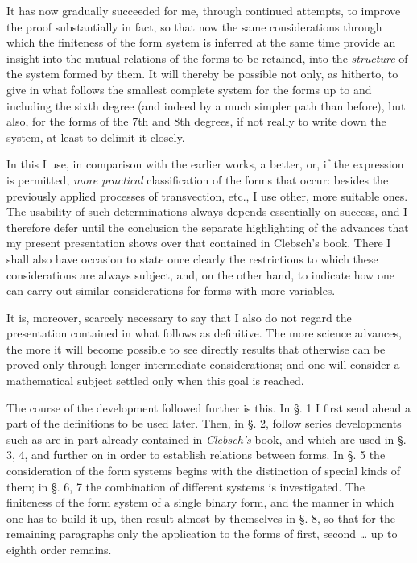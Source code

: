 \documentclass[10pt]{article}
\begin{document}
It has now gradually succeeded for me, through continued attempts, to improve the proof substantially in fact, so that now the same considerations through which the finiteness of the form system is inferred at the same time provide an insight into the mutual relations of the forms to be retained, into the \emph{structure} of the system formed by them. It will thereby be possible not only, as hitherto, to give in what follows the smallest complete system for the forms up to and including the sixth degree (and indeed by a much simpler path than before), but also, for the forms of the 7th and 8th degrees, if not really to write down the system, at least to delimit it closely.

In this I use, in comparison with the earlier works, a better, or, if the expression is permitted, \emph{more practical} classification of the forms that occur: besides the previously applied processes of transvection, etc., I use other, more suitable ones. The usability of such determinations always depends essentially on success, and I therefore defer until the conclusion the separate highlighting of the advances that my present presentation shows over that contained in Clebsch's book. There I shall also have occasion to state once clearly the restrictions to which these considerations are always subject, and, on the other hand, to indicate how one can carry out similar considerations for forms with more variables.

It is, moreover, scarcely necessary to say that I also do not regard the presentation contained in what follows as definitive. The more science advances, the more it will become possible to see directly results that otherwise can be proved only through longer intermediate considerations; and one will consider a mathematical subject settled only when this goal is reached.

The course of the development followed further is this. In §. 1 I first send ahead a part of the definitions to be used later. Then, in §. 2, follow series developments such as are in part already contained in \emph{Clebsch's} book, and which are used in §. 3, 4, and further on in order to establish relations between forms. In §. 5 the consideration of the form systems begins with the distinction of special kinds of them; in §. 6, 7 the combination of different systems is investigated. The finiteness of the form system of a single binary form, and the manner in which one has to build it up, then result almost by themselves in §. 8, so that for the remaining paragraphs only the application to the forms of first, second \ldots{} up to eighth order remains.
\end{document}
